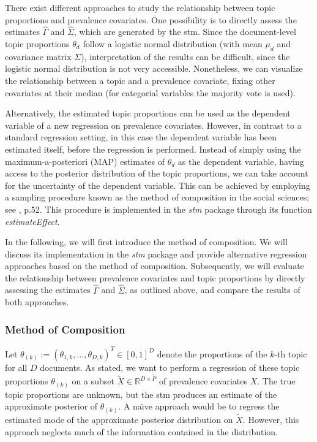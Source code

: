 There exist different approaches to study the relationship between topic proportions and prevalence covariates. One possibility is to directly assess the estimates $\hat{\Gamma}$ and $\hat{\Sigma}$, which are generated by the stm. Since the document-level topic proportions $\theta_d$ follow a logistic normal distribution (with mean $\mu_d$ and covariance matrix $\Sigma$), interpretation of the results can be difficult, since the logistic normal distribution is not very accessible. Nonetheless, we can visualize the relationship between a topic and a prevalence covariate, fixing other covariates at their median (for categorial variables the majority vote is used).

Alternatively, the estimated topic proportions can be used as the dependent variable of a new regression on prevalence covariates. However, in contrast to a standard regression setting, in this case the dependent variable has been estimated itself, before the regression is performed. Instead of simply using the maximum-a-posteriori (MAP) estimates of $\theta_d$ as the dependent variable, having access to the posterior distribution of the topic proportions, we can take account for the uncertainty of the dependent variable. This can be achieved by employing a sampling procedure known as the method of composition in the social sciences; see \cite{tanner2012tools}, p.52. This procedure is implemented in the \textit{stm} package through its function \textit{estimateEffect}.

In the following, we will first introduce the method of composition. We will discuss its implementation in the \textit{stm} package and provide alternative regression approaches based on the method of composition. Subsequently, we will evaluate the relationship between prevalence covariates and topic proportions by directly assessing the estimates $\hat{\Gamma}$ and $\hat{\Sigma}$, as outlined above, and compare the results of both approaches.

\subsubsection{Method of Composition}

Let $\theta_{(k)}:=(\theta_{1,k}, \dots, \theta_{D,k})^T \in [0,1]^{D}$ denote the proportions of the $k$-th topic for all $D$ documents. As stated, we want to perform a regression of these topic proportions $\theta_{(k)}$ on a subset $\tilde{X} \in \mathbb{R}^{D \times \tilde{P}}$ of prevalence covariates $X$. The true topic proportions are unknown, but the stm produces an estimate of the approximate posterior of $\theta_{(k)}$. A na{\"\i}ve approach would be to regress the estimated mode of the approximate posterior distribution on $\tilde{X}$. However, this approach neglects much of the information contained in the distribution. 

